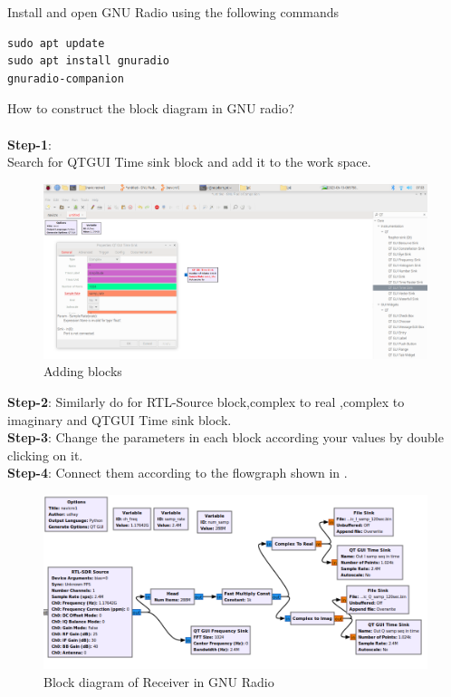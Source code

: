  Install and open GNU Radio using the following commands
\\
\begin{lstlisting}
sudo apt update
sudo apt install gnuradio
gnuradio-companion
\end{lstlisting}
 How to construct the block diagram in GNU radio? \\
	\solution  \\
\textbf{Step-1}:\\
Search for QTGUI Time sink  block and add it to the work space.
\begin{figure}[H]
\centering
\includegraphics[width=\columnwidth]{figs/add.png}
\caption{Adding blocks}
\label{fig:add blocks}
\end{figure}
\textbf{Step-2}:
Similarly do for RTL-Source block,complex to real ,complex to imaginary and QTGUI Time sink block.
\\
\textbf{Step-3}:
Change the parameters in each block according your values by double clicking on it.
\\
\textbf{Step-4}:
Connect them according to the flowgraph shown in .
\begin{figure}[H]
\centering
\includegraphics[width=\columnwidth]{figs/RTL_SDR_test.png}
\caption{Block diagram of Receiver in GNU Radio}
\label{fig:Rx_Block_diagram}
\end{figure}
